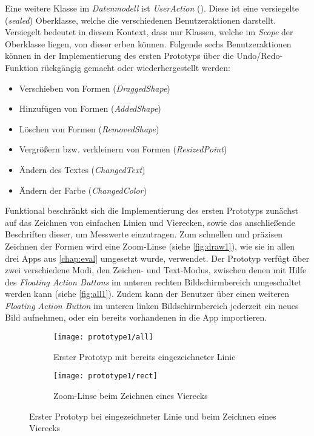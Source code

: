 \noindent
Eine weitere Klasse im \emph{Datenmodell} ist \emph{UserAction} ().
Diese ist eine versiegelte (\emph{sealed}) Oberklasse, welche die verschiedenen Benutzeraktionen darstellt.
Versiegelt bedeutet in diesem Kontext, dass nur Klassen, welche im \emph{Scope} der Oberklasse liegen, von dieser erben können.
Folgende sechs Benutzeraktionen können in der Implementierung des ersten Prototyps über die Undo/Redo-Funktion rückgängig gemacht oder wiederhergestellt werden:

\begin{itemize}
  \item Verschieben von Formen (\emph{DraggedShape})
  \item Hinzufügen von Formen (\emph{AddedShape})
  \item Löschen von Formen (\emph{RemovedShape})
  \item Vergrößern bzw. verkleinern von Formen (\emph{ResizedPoint})
  \item Ändern des Textes (\emph{ChangedText})
  \item Ändern der Farbe (\emph{ChangedColor})
\end{itemize}

\noindent
Funktional beschränkt sich die Implementierung des ersten Prototyps zunächst auf das Zeichnen von einfachen Linien und Vierecken, sowie das anschließende Beschriften dieser, um Messwerte einzutragen.
Zum schnellen und präzisen Zeichnen der Formen wird eine Zoom-Linse (siehe \autoref{fig:draw1}), wie sie in allen drei Apps aus \autoref{chap:eval} umgesetzt wurde, verwendet.
Der Prototyp verfügt über zwei verschiedene Modi, den Zeichen- und Text-Modus, zwischen denen mit Hilfe des \emph{Floating Action Buttons} im unteren rechten Bildschirmbereich umgeschaltet werden kann (siehe \autoref{fig:all1}).
Zudem kann der Benutzer über einen weiteren \emph{Floating Action Button} im unteren linken Bildschirmbereich jederzeit ein neues Bild aufnehmen, oder ein bereits vorhandenen in die App importieren.

\begin{figure}[h]
  \begin{subfigure}[t]{0.4\textwidth}
    \texttt{[image: prototype1/all]}
    \caption{Erster Prototyp mit bereits eingezeichneter Linie}
    \label{fig:all1}
  \end{subfigure}
  \begin{subfigure}[t]{0.4\textwidth}
    \texttt{[image: prototype1/rect]}
    \caption{Zoom-Linse beim Zeichnen eines Vierecks}
    \label{fig:draw1}
  \end{subfigure}
  \centering
  \caption{Erster Prototyp bei eingezeichneter Linie und beim Zeichnen eines Vierecks}
\end{figure}

